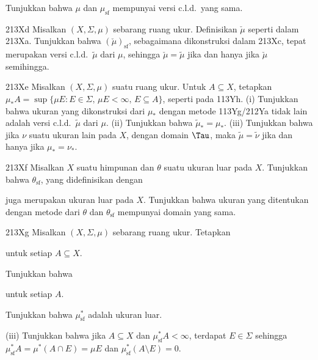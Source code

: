 { Tunjukkan bahwa $\mu$ dan $\mu_{\text{sf}}$ mempunyai versi
c.l.d.\ yang sama.

\spheader 213Xd Misalkan $(X,\Sigma,\mu)$ sebarang ruang ukur.   Definisikan
$\check\mu$ seperti dalam 213Xa.   Tunjukkan bahwa
$(\check\mu)_{\text{sf}}$, sebagaimana dikonstruksi dalam 213Xc, tepat
merupakan versi c.l.d.\ $\tilde\mu$ dari $\mu$, sehingga
$\check\mu=\tilde\mu$ jika dan hanya jika $\check\mu$ semihingga.

\spheader 213Xe Misalkan $(X,\Sigma,\mu)$ suatu ruang ukur.   Untuk
$A\subseteq X$, tetapkan
$\mu_* A=\sup\{\mu E:E\in\Sigma,\,\mu E<\infty,\,E\subseteq A\}$, seperti pada
113Yh.   (i) Tunjukkan bahwa ukuran yang dikonstruksi dari $\mu_*$ dengan
metode 113Yg/212Ya tidak lain adalah versi c.l.d.\ $\tilde\mu$ dari $\mu$.
(ii) Tunjukkan bahwa $\tilde\mu_*=\mu_*$.   (iii) Tunjukkan bahwa jika $\nu$
suatu ukuran lain pada $X$, dengan domain $\Tau$, maka
$\tilde\mu=\tilde\nu$ jika dan hanya jika
$\mu_*=\nu_*$.

\spheader 213Xf Misalkan $X$ suatu himpunan dan $\theta$ suatu ukuran luar
pada $X$. Tunjukkan bahwa $\theta_{\text{sf}}$, yang didefinisikan dengan


\noindent juga merupakan ukuran luar pada $X$.   Tunjukkan bahwa ukuran yang
ditentukan dengan metode \Caratheodory dari $\theta$ dan
$\theta_{\text{sf}}$ mempunyai domain yang sama.

\spheader 213Xg Misalkan $(X,\Sigma,\mu)$ sebarang ruang ukur.   Tetapkan


\noindent untuk setiap $A\subseteq X$.

 Tunjukkan bahwa


\noindent untuk setiap $A$.

 Tunjukkan bahwa $\mu^*_{\text{sf}}$ adalah ukuran luar.

\quad(iii) Tunjukkan bahwa jika $A\subseteq X$ dan
$\mu^*_{\text{sf}}A<\infty$, terdapat $E\in\Sigma$ sehingga
$\mu^*_{\text{sf}}A=\mu^*(A\cap E)=\mu E$ dan
$\mu^*_{\text{sf}}(A\setminus E)=0$.   

}

